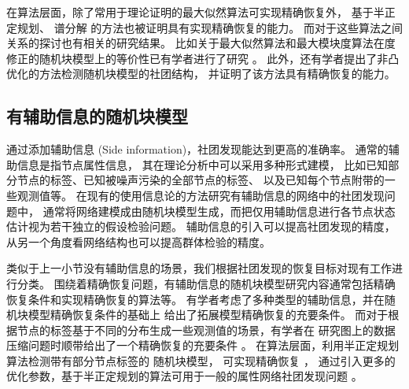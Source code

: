
在算法层面，除了常用于理论证明的最大似然算法可实现精确恢复外，
基于半正定规划\cite{hajek2016achieving,amini2018semidefinite}、
谱分解\cite{Yun2014} 的方法也被证明具有实现精确恢复的能力。
而对于这些算法之间关系的探讨也有相关的研究结果。
比如关于最大似然算法和最大模块度算法在度修正的随机块模型上的等价性已有学者进行了研究 \cite{newman2016equivalence}。
此外，还有学者提出了非凸优化的方法检测随机块模型的社团结构，
并证明了该方法具有精确恢复的能力\cite{wang2021non}。




\subsection{有辅助信息的随机块模型}
通过添加辅助信息 (Side information)，社团发现能达到更高的准确率。
通常的辅助信息是指节点属性信息\cite{he2019attribute}，
其在理论分析中可以采用多种形式建模，
比如已知部分节点的标签、已知被噪声污染的全部节点的标签、
以及已知每个节点附带的一些观测值等\cite{saad2018community}。
在现有的使用信息论的方法研究有辅助信息的网络中的社团发现问题中，
通常将网络建模成由随机块模型生成，而把仅用辅助信息进行各节点状态估计视为若干独立的假设检验问题\cite{ahn2023testing}。
辅助信息的引入可以提高社团发现的精度，从另一个角度看网络结构也可以提高群体检验的精度。

类似于上一小节没有辅助信息的场景，我们根据社团发现的恢复目标对现有工作进行分类。
围绕着精确恢复问题，有辅助信息的随机块模型研究内容通常包括精确恢复条件和实现精确恢复的算法等。
有学者考虑了多种类型的辅助信息，并在随机块模型精确恢复条件的基础上
给出了拓展模型精确恢复的充要条件\cite{saad2018community, esmaeili2019community}。
而对于根据节点的标签基于不同的分布生成一些观测值的场景，有学者在
研究图上的数据压缩问题时顺带给出了一个精确恢复的充要条件 \cite{abbe17sideinfo}。
在算法层面，利用半正定规划算法检测带有部分节点标签的 随机块模型，
可实现精确恢复 \cite{esmaeili2019exact}，
通过引入更多的优化参数，基于半正定规划的算法可用于一般的属性网络社团发现问题
\cite{tang2023semidefinite}。

